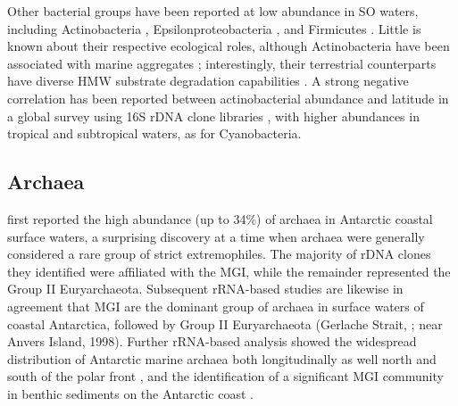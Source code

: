 Other bacterial groups have been reported at low abundance in \ac{SO} waters, including Actinobacteria \cite{Bowman:2003fa,Brinkmeyer:2003iq,Abell:2005ji,Gentile:2006ef,Murray:2007db,Murray:2011ib,Ghiglione:2011ee,Piquet:2011fj,Jamieson:2012up}, Epsilonproteobacteria \cite{Gentile:2006ef,Murray:2007db}, and Firmicutes \cite{Murray:2007db,Anonymous:2011bw,Murray:2011ib}.
Little is known about their respective ecological roles, although Actinobacteria have been associated with marine aggregates \cite{Grossart:2006ez}; interestingly, their terrestrial counterparts have diverse \ac{HMW} substrate degradation capabilities \citep[reviewed in][]{Kirchman:2008wz}.
A strong negative correlation has been reported between actinobacterial abundance and latitude in a global survey using 16S rDNA clone libraries \cite{Pommier:2007vz}, with higher abundances in tropical and subtropical waters, as for Cyanobacteria.

\subsection{Archaea}

\citet{DeLong:1994id} first reported the high abundance (up to 34\%) of archaea in Antarctic coastal surface waters, a surprising discovery at a time when archaea were generally considered a rare group of strict extremophiles.
The majority of rDNA clones they identified were affiliated with the \ac{MGI}, while the remainder represented the Group II Euryarchaeota.
Subsequent rRNA-based studies are likewise in agreement that \ac{MGI} are the dominant group of archaea in surface waters of coastal Antarctica, followed by Group II Euryarchaeota (Gerlache Strait, \citet{Massana:1998tn}; near Anvers Island, \citet{Murray:1998wy}1998).
Further rRNA-based analysis showed the widespread distribution of Antarctic marine archaea both longitudinally as well north and south of the polar front \cite{Murray:1999tx,Topping:2006ul,Jamieson:2012up}, and the identification of a significant \ac{MGI} community in benthic sediments on the Antarctic coast \cite{Bowman:2003fa}.

